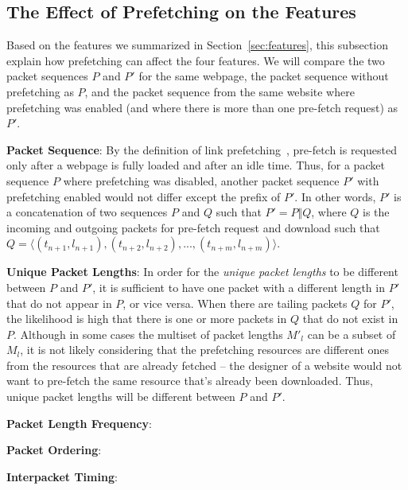 \subsection{The Effect of Prefetching on the Features}

Based on the features we summarized in Section~\ref{sec:features}, this subsection explain how prefetching can affect the four features.
We will compare the two packet sequences $P$ and $P'$ for the same webpage, 
the packet sequence without prefetching as $P$, and the packet sequence from the same website where prefetching was enabled (and where there is more than one pre-fetch request) as $P'$.

{\bf Packet Sequence}:
By the definition of link prefetching~\cite{fisher2014link}, pre-fetch is requested only after a webpage is fully loaded and after an idle time.
Thus, for a packet sequence $P$ where prefetching was disabled, another packet sequence $P'$ with prefetching enabled would not differ except the prefix of $P'$.
In other words, $P'$ is a concatenation of two sequences $P$ and $Q$ such that $P' = P \Vert Q$, where $Q$ is the incoming and outgoing packets for pre-fetch request and download such that $Q = \langle(t_{n+1}, l_{n+1}), (t_{n+2}, l_{n+2}), ..., (t_{n+m}, l_{n+m})\rangle$.

{\bf Unique Packet Lengths}: 
In order for the {\it unique packet lengths} to be different between $P$ and $P'$, it is sufficient to have one packet with a different length in $P'$ that do not appear in $P$, or vice versa.
When there are tailing packets $Q$ for $P'$, the likelihood is high that there is one or more packets in $Q$ that do not exist in $P$.
Although in some cases the multiset of packet lengths $M'_l$ can be a subset of $M_l$, it is not likely considering that the prefetching resources are different ones from the resources that are already fetched -- the designer of a website would not want to pre-fetch the same resource that's already been downloaded.
Thus, unique packet lengths will be different between $P$ and $P'$.

{\bf Packet Length Frequency}:


{\bf Packet Ordering}:


{\bf Interpacket Timing}:


